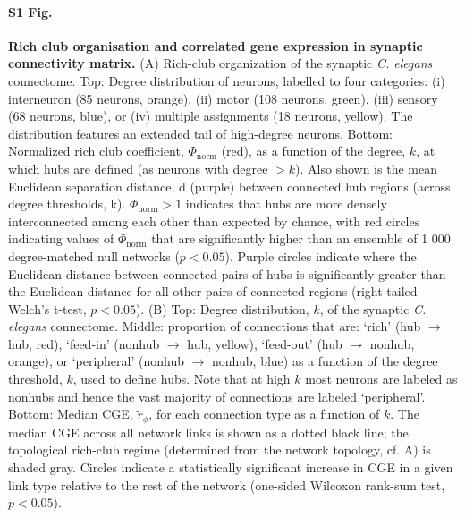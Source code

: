 \documentclass[10pt,letterpaper]{article}
\begin{document}
\paragraph*{S1 Fig.}
\label{S1_Fig}
{\bf Rich club organisation and correlated gene expression in synaptic connectivity matrix.}
(A) Rich-club organization of the synaptic \textit{C. elegans} connectome.
Top: Degree distribution of neurons, labelled to four categories: (i) interneuron (85 neurons, orange), (ii) motor (108 neurons, green), (iii) sensory (68 neurons, blue), or (iv) multiple assignments (18 neurons, yellow).
The distribution features an extended tail of high-degree neurons. Bottom: Normalized rich club coefficient, $\Phi_\mathrm{norm}$ (red), as a function of the degree, $k$, at which hubs are defined (as neurons with degree $>k$).
Also shown is the mean Euclidean separation distance, d (purple) between connected hub regions (across degree thresholds, k). $\Phi_\mathrm{norm} > 1$ indicates that hubs are more densely interconnected among each other than expected by chance, with red circles indicating values of $\Phi_\mathrm{norm}$ that are significantly higher than an ensemble of 1 000 degree-matched null networks ($p < 0.05$).
Purple circles indicate where the Euclidean distance between connected pairs of hubs is significantly greater than the Euclidean distance for all other pairs of connected regions (right-tailed Welch's t-test, $p < 0.05$).
(B) Top: Degree distribution, $k$, of the synaptic \textit{C. elegans}  connectome.
Middle: proportion of connections that are: `rich' (hub $\rightarrow$ hub, red), `feed-in' (nonhub $\rightarrow$ hub, yellow), `feed-out' (hub $\rightarrow$ nonhub, orange), or `peripheral' (nonhub $\rightarrow$ nonhub, blue) as a function of the degree threshold, $k$, used to define hubs.
Note that at high $k$ most neurons are labeled as nonhubs and hence the vast majority of connections are labeled `peripheral'.
Bottom: Median CGE, $\tilde{r}_\phi$, for each connection type as a function of $k$.
The median CGE across all network links is shown as a dotted black line; the topological rich-club regime (determined from the network topology, cf. A) is shaded gray.
Circles indicate a statistically significant increase in CGE in a given link type relative to the rest of the network (one-sided Wilcoxon rank-sum test, $p < 0.05$).
\end{document}
